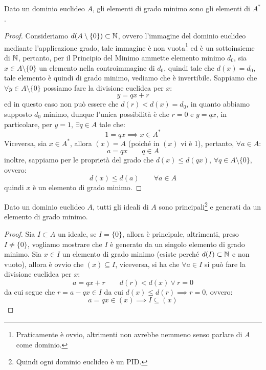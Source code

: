 \documentclass[11pt]{scrartcl}
\begin{document}
\begin{proposition}
    Dato un dominio euclideo $A$, gli elementi di grado minimo sono gli elementi di $A^*$.
\end{proposition}

\begin{proof}
    Consideriamo $d(A\setminus\{0\}) \subset \mathbb N$, ovvero l'immagine del dominio euclideo mediante l'applicazione grado, tale immagine è non vuota\footnote{Praticamente è ovvio, altrimenti non avrebbe nemmeno senso
    parlare di $A$ come dominio.} ed è un sottoinsieme di $\mathbb N$, pertanto, per il Principio del Minimo ammette elemento minimo $d_0$, sia $x \in A\setminus\{0\}$ un elemento nella controimmagine di $d_0$, quindi
    tale che $d(x) = d_0$, tale elemento è quindi di grado minimo, vediamo che è invertibile. Sappiamo che $\forall y \in A\setminus\{0\}$ possiamo fare la divisione euclidea per $x$:
    \[ y = qx + r
        \]
    ed in questo caso non può essere che $d(r) < d(x) = d_0$, in quanto abbiamo supposto $d_0$ minimo, dunque l'unica possibilità è che $r = 0$ e $y = qx$, in particolare, per $y = 1$, $\exists q \in A$ tale che:
    \[ 1 = qx \implies x \in A^*
        \]
    Viceversa, sia $x \in A^*$, allora $(x) = A$ (poiché in $(x)$ vi è 1), pertanto, $\forall a \in A$:
    \[ a = qx \qquad q \in A
        \]
    inoltre, sappiamo per le proprietà del grado che $d(x) \leq d(qx)$, $\forall q \in A\setminus\{0\}$, ovvero:
    \[ d(x) \leq d(a) \qquad \forall a \in A
        \]
    quindi $x$ è un elemento di grado minimo.
\end{proof}

\begin{proposition}
    \label{2.93}
    Dato un dominio euclideo $A$, tutti gli ideali di $A$ sono principali\footnote{Quindi ogni dominio euclideo è un PID.} e generati da un elemento di grado minimo.
\end{proposition}

\begin{proof}
    Sia $I \subset A$ un ideale, se $I = \{0\}$, allora è principale, altrimenti, preso $I \ne \{0\}$, vogliamo mostrare che $I$ è generato da un singolo elemento di grado minimo.
    Sia $x \in I$ un elemento di grado minimo (esiste perché $d(I) \subset \mathbb N$ e non vuoto), allora è ovvio che $(x) \subseteq I$, viceversa, si ha che $\forall a \in I$ si può fare la divisione euclidea per $x$:
    \[ a = qx + r \qquad d(r) < d(x) \vee r = 0
        \]
    da cui segue che $r = a - qx \in I$ da cui $d(x) \leq d(r) \implies r = 0$, ovvero:
    \[ a = qx \in (x) \implies I \subseteq (x)
        \]
\end{proof}
\end{document}
